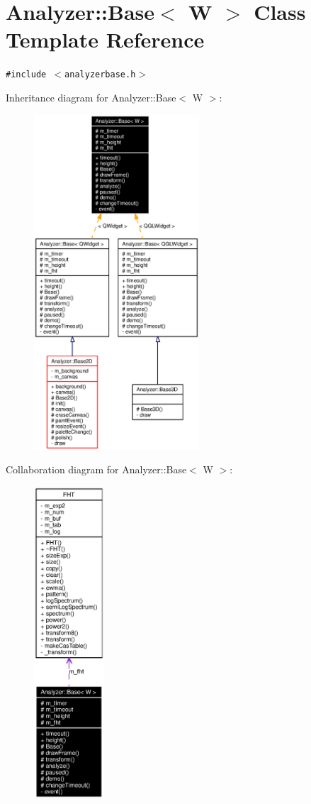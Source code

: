 \section{Analyzer::Base$<$ W $>$ Class Template Reference}
\label{classAnalyzer_1_1Base}
{\tt \#include $<$analyzerbase.h$>$}

Inheritance diagram for Analyzer::Base$<$ W $>$:\begin{figure}[H]
\begin{center}
\leavevmode
\includegraphics[width=175pt]{classAnalyzer_1_1Base__inherit__graph}
\end{center}
\end{figure}
Collaboration diagram for Analyzer::Base$<$ W $>$:\begin{figure}[H]
\begin{center}
\leavevmode
\includegraphics[width=74pt]{classAnalyzer_1_1Base__coll__graph}
\end{center}
\end{figure}
